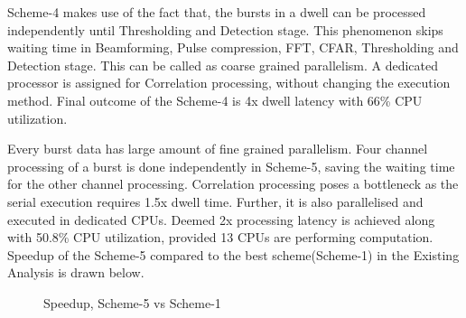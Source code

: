 Scheme-4 makes use of the fact that, the bursts in a dwell can be processed independently until Thresholding and Detection stage. This phenomenon skips waiting time in Beamforming, Pulse compression, FFT, CFAR, Thresholding and Detection stage. This can be called as coarse grained parallelism. A dedicated processor is assigned for Correlation processing, without changing the execution method. Final outcome of the Scheme-4 is 4x dwell latency with 66\% CPU utilization.

Every burst data has large amount of fine grained parallelism. Four channel processing of a burst is done independently in Scheme-5, saving the waiting time for the other channel processing.  Correlation processing poses a bottleneck as the serial execution requires 1.5x dwell time. Further, it is also parallelised and executed in dedicated CPUs. Deemed 2x processing latency is achieved along with 50.8\% CPU utilization, provided 13 CPUs are performing computation. Speedup of the Scheme-5 compared to the best scheme(Scheme-1) in the Existing Analysis is drawn below.

\begin{figure}[h!]
\centering
\caption{Speedup, Scheme-5 vs Scheme-1}
\label{mm:scheme5_speedup}
\end{figure}
